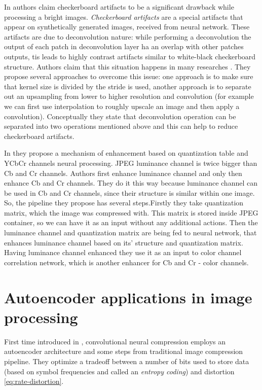 In \cite{odena_deconvolution_2016} authors claim checkerboard artifacts to be a significant drawback while processing a bright images. \textit{Checkerboard artifacts} are a special artifacts that appear on synthetically generated images, received from neural network. These artifacts are due to deconvolution nature: while performing a deconvolution the output of each patch in deconvolution layer ha an overlap with other patches outputs, tis leads to highly contrast artifacts similar to white-black checkerboard structure. Authors claim that this situation happens in many researches \cite{dumoulin_adversarially_2017,donahue_adversarial_2017,salimans_improved_2016,radford_unsupervised_2016}. They propose several approaches to overcome this issue: one approach is to make sure that kernel size is divided by the stride is used, another approach is to separate out an upsampling from lower to higher resolution and convolution (for example we can first use interpolation to roughly upscale an image and then apply a convolution). Conceptually they state that deconvolution operation can be separated into two operations mentioned above and this can help to reduce checkerboard artifacts.

In \cite{ehrlich_quantization_2020} they propose a mechanism of enhancement based on quantization table and YCbCr channels neural processing. JPEG \cite{JPEG-1992} luminance channel is twice bigger than Cb and Cr channels. Authors first enhance luminance channel and only then enhance Cb and Cr channels. They do it this way because luminance channel can be used in Cb and Cr channels, since their structure is similar within one image. So, the pipeline they propose has several steps.Firstly they take quantization matrix, which the image was compressed with. This matrix is stored inside JPEG container, so we can have it as an input without any additional actions. Then the luminance channel and quantization matrix are being fed to neural network, that enhances luminance channel based on its' structure and quantization matrix. Having luminance channel enhanced they use it as an input to color channel correlation network, which is another enhancer for Cb and Cr - color channels.



\section{Autoencoder applications in image processing}

First time introduced in \cite{toderici_full_2017}, convolutional neural compression employs an autoencoder architecture and some steps from traditional image compression pipeline. They optimize a tradeoff between a number of bits used to store data (based on symbol frequencies and called an \textit{entropy coding}) and distortion \ref{eq:rate-distortion}.

